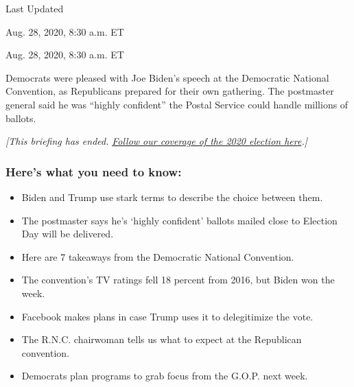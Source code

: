 Last Updated

Aug. 28, 2020, 8:30 a.m. ET

Aug. 28, 2020, 8:30 a.m. ET

Democrats were pleased with Joe Biden's speech at the Democratic
National Convention, as Republicans prepared for their own gathering.
The postmaster general said he was ``highly confident'' the Postal
Service could handle millions of ballots.

\emph{{[}This briefing has ended.}
\href{https://www.nytimes3xbfgragh.onion/live/2020/08/22/us/trump-vs-biden}{\emph{Follow
our coverage of the 2020 election here}}\emph{.{]}}

\hypertarget{heres-what-you-need-to-know}{%
\subsubsection{Here's what you need to
know:}\label{heres-what-you-need-to-know}}

\begin{itemize}
\item
  \protect\hyperlink{biden-and-trump-use-stark-terms-to-describe-the-choice-between-them}{}

  Biden and Trump use stark terms to describe the choice between them.
\item
  \protect\hyperlink{the-postmaster-says-hes-highly-confident-ballots-mailed-close-to-election-day-will-be-delivered}{}

  The postmaster says he's `highly confident' ballots mailed close to
  Election Day will be delivered.
\item
  \protect\hyperlink{here-are-7-takeaways-from-the-democratic-national-convention}{}

  Here are 7 takeaways from the Democratic National Convention.
\item
  \protect\hyperlink{the-conventions-tv-ratings-fell-18-percent-from-2016-but-biden-won-the-week}{}

  The convention's TV ratings fell 18 percent from 2016, but Biden won
  the week.
\item
  \protect\hyperlink{facebook-makes-plans-in-case-trump-uses-it-to-delegitimize-the-vote}{}

  Facebook makes plans in case Trump uses it to delegitimize the vote.
\item
  \protect\hyperlink{the-rnc-chairwoman-tells-us-what-to-expect-at-the-republican-convention}{}

  The R.N.C. chairwoman tells us what to expect at the Republican
  convention.
\item
  \protect\hyperlink{democrats-plan-programs-to-grab-focus-from-the-gop-next-week}{}

  Democrats plan programs to grab focus from the G.O.P. next week.
\end{itemize}

